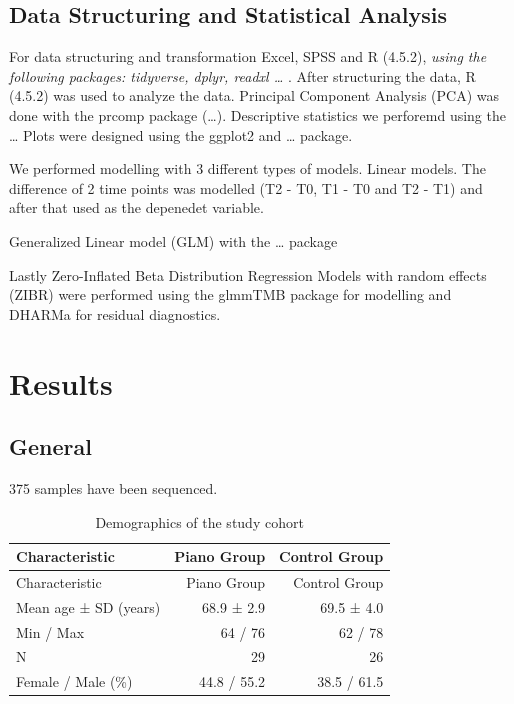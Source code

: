 \documentclass[
  letterpaper,
  DIV=11,
  numbers=noendperiod]{scrartcl}
\begin{document}
\subsection{Data Structuring and Statistical
Analysis}\label{data-structuring-and-statistical-analysis}

For data structuring and transformation Excel, SPSS and R (4.5.2),
\emph{using the following packages: tidyverse, dplyr, readxl \ldots{}} .
After structuring the data, R (4.5.2) was used to analyze the data.
Principal Component Analysis (PCA) was done with the prcomp package
(\ldots). Descriptive statistics we perforemd using the \ldots{} Plots
were designed using the ggplot2 and \ldots{} package.

We performed modelling with 3 different types of models. Linear models.
The difference of 2 time points was modelled (T2 - T0, T1 - T0 and T2 -
T1) and after that used as the depenedet variable.

Generalized Linear model (GLM) with the \ldots{} package

Lastly Zero-Inflated Beta Distribution Regression Models with random
effects (ZIBR) were performed using the glmmTMB package for modelling
and DHARMa for residual diagnostics.

\section{Results}\label{sec-results}

\subsection{General}\label{general}

375 samples have been sequenced.

\begin{longtable}[]{@{}lrr@{}}
\caption{Demographics of the study
cohort}\label{tbl-demographics}\tabularnewline
\toprule\noalign{}
Characteristic & Piano Group & Control Group \\
\midrule\noalign{}
\endfirsthead
\toprule\noalign{}
Characteristic & Piano Group & Control Group \\
\midrule\noalign{}
\endhead
\bottomrule\noalign{}
\endlastfoot
Mean age ± SD (years) & 68.9 ± 2.9 & 69.5 ± 4.0 \\
Min / Max & 64 / 76 & 62 / 78 \\
N & 29 & 26 \\
Female / Male (\%) & 44.8 / 55.2 & 38.5 / 61.5 \\
\end{longtable}
\end{document}
